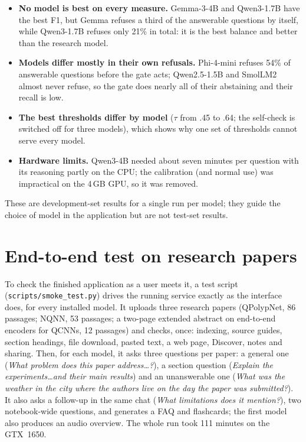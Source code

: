 \begin{itemize}
\item \textbf{No model is best on every measure.} Gemma-3-4B and Qwen3-1.7B have the best F1, but Gemma refuses a third of the answerable questions by itself, while Qwen3-1.7B refuses only 21\% in total: it is the best balance and better than the research model.
\item \textbf{Models differ mostly in their own refusals.} Phi-4-mini refuses 54\% of answerable questions before the gate acts; Qwen2.5-1.5B and SmolLM2 almost never refuse, so the gate does nearly all of their abstaining and their recall is low.
\item \textbf{The best thresholds differ by model} ($\tau$ from .45 to .64; the self-check is switched off for three models), which shows why one set of thresholds cannot serve every model.
\item \textbf{Hardware limits.} Qwen3-4B needed about seven minutes per question with its reasoning partly on the CPU; the calibration (and normal use) was impractical on the 4\,GB GPU, so it was removed.
\end{itemize}
These are development-set results for a single run per model; they guide the choice of model in the application but are not test-set results.

\section{End-to-end test on research papers}\label{sec:smoke}
To check the finished application as a user meets it, a test script (\texttt{scripts/smoke\_test.py}) drives the running service exactly as the interface does, for every installed model. It uploads three research papers (QPolypNet, 86 passages; NQNN, 53 passages; a two-page extended abstract on end-to-end encoders for QCNNs, 12 passages) and checks, once: indexing, source guides, section headings, file download, pasted text, a web page, Discover, notes and sharing. Then, for each model, it asks three questions per paper: a general one (\emph{What problem does this paper address\dots?}), a section question (\emph{Explain the experiments\dots and their main results}) and an unanswerable one (\emph{What was the weather in the city where the authors live on the day the paper was submitted?}). It also asks a follow-up in the same chat (\emph{What limitations does it mention?}), two notebook-wide questions, and generates a FAQ and flashcards; the first model also produces an audio overview. The whole run took 111 minutes on the GTX~1650.

